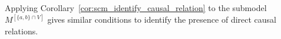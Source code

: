 Applying Corollary~\ref{cor:scm_identify_causal_relation} to the submodel $M^{[\{a,b\}\cap V]}$ gives similar conditions to identify the presence of direct causal relations.
%
